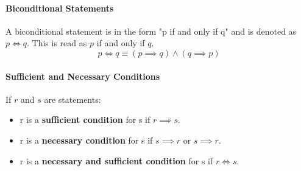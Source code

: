 \paragraph{Biconditional Statements}
A biconditional statement is in the form "p if and only if q" and is denoted as $p \iff q$. This is read as $p$ if and only if $q$.\\
\begin{equation}
    p \iff q \equiv (p \implies q )\land (q \implies p)
\end{equation}

\paragraph*{Sufficient and Necessary Conditions}
If $r$ and $s$ are statements:
\begin{itemize}
    \item r is a \textbf{sufficient condition} for s if $r \implies s$.
    \item r is a \textbf{necessary condition} for s if $s \implies r$ or $s \implies r$.
    \item r is a \textbf{necessary and sufficient condition} for s if $r \iff s$.
\end{itemize}